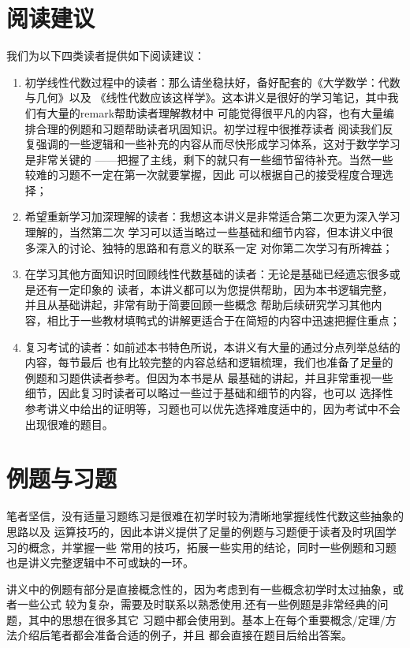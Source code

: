 \section*{阅读建议}
我们为以下四类读者提供如下阅读建议：
\begin{enumerate}
    \item 初学线性代数过程中的读者：那么请坐稳扶好，备好配套的《大学数学：代数与几何》以及
    《线性代数应该这样学》。这本讲义是很好的学习笔记，其中我们有大量的remark帮助读者理解教材中
    可能觉得很平凡的内容，也有大量编排合理的例题和习题帮助读者巩固知识。初学过程中很推荐读者
    阅读我们反复强调的一些逻辑和一些补充的内容从而尽快形成学习体系，这对于数学学习是非常关键的
    ——把握了主线，剩下的就只有一些细节留待补充。当然一些较难的习题不一定在第一次就要掌握，因此
    可以根据自己的接受程度合理选择；
    \item 希望重新学习加深理解的读者：我想这本讲义是非常适合第二次更为深入学习理解的，当然第二次
    学习可以适当略过一些基础和细节内容，但本讲义中很多深入的讨论、独特的思路和有意义的联系一定
    对你第二次学习有所裨益；
    \item 在学习其他方面知识时回顾线性代数基础的读者：无论是基础已经遗忘很多或是还有一定印象的
    读者，本讲义都可以为您提供帮助，因为本书逻辑完整，并且从基础讲起，非常有助于简要回顾一些概念
    帮助后续研究学习其他内容，相比于一些教材填鸭式的讲解更适合于在简短的内容中迅速把握住重点；
    \item 复习考试的读者：如前述本书特色所说，本讲义有大量的通过分点列举总结的内容，每节最后
    也有比较完整的内容总结和逻辑梳理，我们也准备了足量的例题和习题供读者参考。但因为本书是从
    最基础的讲起，并且非常重视一些细节，因此复习时读者可以略过一些过于基础和细节的内容，也可以
    选择性参考讲义中给出的证明等，习题也可以优先选择难度适中的，因为考试中不会出现很难的题目。
\end{enumerate}

\section*{例题与习题}
笔者坚信，没有适量习题练习是很难在初学时较为清晰地掌握线性代数这些抽象的思路以及
运算技巧的，因此本讲义提供了足量的例题与习题便于读者及时巩固学习的概念，并掌握一些
常用的技巧，拓展一些实用的结论，同时一些例题和习题也是讲义完整逻辑中不可或缺的一环。

讲义中的例题有部分是直接概念性的，因为考虑到有一些概念初学时太过抽象，或者一些公式
较为复杂，需要及时联系以熟悉使用.还有一些例题是非常经典的问题，其中的思想在很多其它
习题中都会使用到。基本上在每个重要概念/定理/方法介绍后笔者都会准备合适的例子，并且
都会直接在题目后给出答案。

